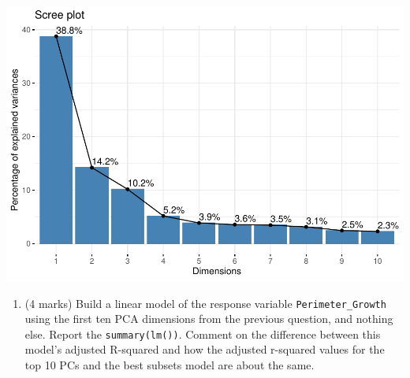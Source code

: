 \documentclass[
]{article}
\newenvironment{Shaded}{\begin{snugshade}}{\end{snugshade}}
\newcommand{\AttributeTok}[1]{\textcolor[rgb]{0.13,0.29,0.53}{#1}}
\newcommand{\DecValTok}[1]{\textcolor[rgb]{0.00,0.00,0.81}{#1}}
\newcommand{\FunctionTok}[1]{\textcolor[rgb]{0.13,0.29,0.53}{\textbf{#1}}}
\newcommand{\NormalTok}[1]{#1}
\newcommand{\OtherTok}[1]{\textcolor[rgb]{0.56,0.35,0.01}{#1}}
\newcommand{\SpecialCharTok}[1]{\textcolor[rgb]{0.81,0.36,0.00}{\textbf{#1}}}
\providecommand{\tightlist}{%
  \setlength{\itemsep}{0pt}\setlength{\parskip}{0pt}}
\begin{document}
\includegraphics{STAT847_A2_Cbverghe_files/figure-latex/unnamed-chunk-8-1.pdf}
\newpage

\begin{enumerate}
\def\labelenumi{\arabic{enumi}.}
\setcounter{enumi}{6}
\tightlist
\item
  (4 marks) Build a linear model of the response variable
  \texttt{Perimeter\_Growth} using the first ten PCA dimensions from the
  previous question, and nothing else. Report the
  \texttt{summary(lm())}. Comment on the difference between this model's
  adjusted R-squared and how the adjusted r-squared values for the top
  10 PCs and the best subsets model are about the same.
\end{enumerate}

\begin{Shaded}
\end{Shaded}
\end{document}
